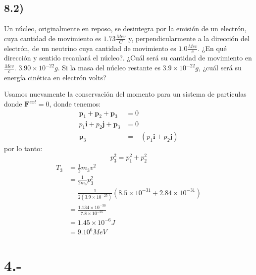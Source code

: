 \documentclass{article}
\begin{document}
\subsection*{8.2)}
Un núcleo, originalmente en reposo, se desintegra por la emisión de un electrón, cuya 
cantidad de movimiento es $1.73 \frac{Mev}{C}$ y, perpendicularmente a la dirección del
electrón, de un neutrino cuya cantidad de movimiento es $1.0\frac{Mev}{c}$. ¿En qué dirección y 
sentido recaulará el núcleo?. ¿Cuál será su cantidad de movimiento en $\frac{Mev}{c}$. 
$3.90 \times 10^{-22}g$. Si la masa del núcleo restante es 
$3.9 \times 10^{-22}g$, ¿cuál será su energía cinética en electrón volts? 
\begin{tcolorbox}[breakable]
    Usamos nuevamente la conservación del momento para un sistema de partículas donde $\bm{F}^{ext} = 0$, donde tenemos:
    \begin{align*}
        \bm{p}_1 + \bm{p}_2 + \bm{p}_3 &= 0 \\
        p_1\bm{i} + p_2\bm{j} + \bm{p}_3 &= 0 \\
        \bm{p}_3 &= -(p_1\bm{i} + p_2\bm{j})
    \end{align*}
    por lo tanto:
    \[ p_3^2 = p_1^2 + p_2^2 \]
    \begin{align*}
        T_3 
        &= \frac{1}{2}m_3v^2 \\
        &= \frac{1}{2m_3}p_3^2 \\
        &= \frac{1}{2(3.9 \times 10^{-25})}(8.5 \times 10^{-31} + 2.84 \times 10^{-31}) \\
        &= \frac{1.134 \times 10^{-30}}{7.8 \times 10^{-25}} \\
        &= 1.45 \times 10^{-6}J \\
        &= 9.10^6 MeV
    \end{align*}
\end{tcolorbox}

\section*{4.-}
\end{document}
